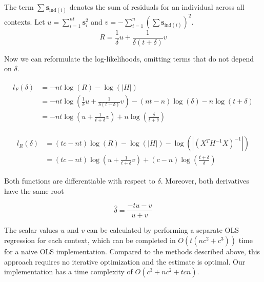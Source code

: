         The term $ \sum \mathbf{s}_{\text{ind}(i)} $ denotes the sum of residuals for an individual across all contexts. Let $u = \sum_{i=1}^{nt} \mathbf{s}_i^2$ and $v = -\sum_{i=1}^{n} \left(\sum \mathbf{s}_{\text{ind}(i)}\right)^2$.
        \begin{equation}
            R = \frac{1}{\delta}u + \frac{1}{\delta(t + \delta)} v
        \end{equation}
        
        Now we can reformulate the log-likelihoods, omitting terms that do not depend on $\delta$.
        
        \begin{align}
        \begin{split}
            l_F(\delta) & = -nt\log{(R)} - \log(|H|) \\
                        & = -nt\log{\left(\frac{1}{\delta}u + \frac{1}{\delta(t + \delta)} v\right)} - (nt - n)\log{(\delta)} - n\log{(t+\delta)} \\
                        & = -nt\log{\left(u + \frac{1}{t+\delta} v\right)} + n \log{\left(\frac{\delta}{t+\delta}\right)}
        \end{split}
        \end{align}
        
        \begin{align}
        \begin{split}
            l_R(\delta) & = (tc-nt)\log{(R)} - \log(|H|) - \log{(|(X^TH^{-1}X)^{-1}|)} \\
                        & = (tc-nt)\log{\left(u + \frac{1}{t+\delta} v\right)} + (c-n)\log{\left(\frac{t+\delta}{\delta}\right)}
        \end{split}
        \end{align}
        
        Both functions are differentiable with respect to $\delta$. Moreover, both derivatives have the same root
        
        \begin{equation}
            \hat{\delta} = \frac{-tu - v}{u+v}
        \end{equation}
    
        The scalar values $u$ and $v$ can be calculated by performing a separate OLS regression for each context, which can be completed in $O(t(nc^2 + c^3))$ time for a naive OLS implementation. Compared to the methods described above, this approach requires no iterative optimization and the estimate is optimal. Our implementation has a time complexity of $O(c^3 + nc^2 + tcn)$. 
        
